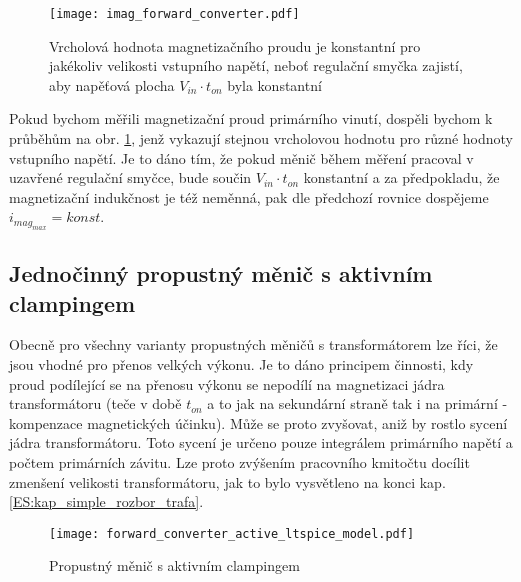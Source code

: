     \begin{figure}[ht!]
    \centering
    \texttt{[image: imag\_forward\_converter.pdf]}
    \caption[Magnetizační proud]{Vrcholová hodnota magnetizačního proudu je konstantní pro
             jakékoliv velikosti vstupního napětí, neboť regulační smyčka zajistí, aby napěťová
             plocha $V_{in}\cdot t_{on}$ byla konstantní}
    \label{enz:fig_imag_forward_converter}
    \end{figure}
    
    Pokud bychom měřili magnetizační proud primárního vinutí, dospěli bychom k průběhům na obr.
    \ref{enz:fig_imag_forward_converter}, jenž vykazují stejnou vrcholovou hodnotu pro různé hodnoty
    vstupního napětí. Je to dáno tím, že pokud měnič během měření pracoval v uzavřené regulační
    smyčce, bude součin $V_{in}\cdot t_{on}$ konstantní a za předpokladu, že magnetizační indukčnost
    je též neměnná, pak dle předchozí rovnice dospějeme $i_{mag_{max}} = konst$.
   
  \subsection{Jednočinný propustný měnič s aktivním clampingem}\label{ENZ:kap_afwdconv}  
    Obecně pro všechny varianty  propustných měničů s transformátorem lze říci, že jsou vhodné pro
    přenos velkých výkonu. Je to dáno principem činnosti, kdy proud podílející se na přenosu výkonu
    se nepodílí na magnetizaci jádra transformátoru (teče v době $t_{on}$ a to jak na sekundární
    straně tak i na primární - kompenzace magnetických účinku). Může se proto zvyšovat, aniž by
    rostlo sycení jádra transformátoru. Toto sycení je určeno pouze integrálem primárního napětí a
    počtem primárních závitu. Lze proto zvýšením pracovního kmitočtu docílit zmenšení velikosti
    transformátoru, jak to bylo vysvětleno na konci kap. \ref{ES:kap_simple_rozbor_trafa}.
    \begin{figure}[ht!]
      \centering
      \texttt{[image: forward\_converter\_active\_ltspice\_model.pdf]}
      \caption[Propustný měnič s aktivním clampingem]{Propustný měnič s aktivním clampingem}
      \label{enz:fig_imag_a_lt_frwd_conv}
    \end{figure}   


